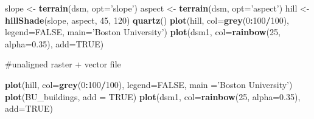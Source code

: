 \documentclass[]{article}
\newenvironment{Shaded}{\begin{snugshade}}{\end{snugshade}}
\newcommand{\DataTypeTok}[1]{\textcolor[rgb]{0.13,0.29,0.53}{#1}}
\newcommand{\DecValTok}[1]{\textcolor[rgb]{0.00,0.00,0.81}{#1}}
\newcommand{\FloatTok}[1]{\textcolor[rgb]{0.00,0.00,0.81}{#1}}
\newcommand{\KeywordTok}[1]{\textcolor[rgb]{0.13,0.29,0.53}{\textbf{#1}}}
\newcommand{\NormalTok}[1]{#1}
\newcommand{\OperatorTok}[1]{\textcolor[rgb]{0.81,0.36,0.00}{\textbf{#1}}}
\newcommand{\OtherTok}[1]{\textcolor[rgb]{0.56,0.35,0.01}{#1}}
\newcommand{\StringTok}[1]{\textcolor[rgb]{0.31,0.60,0.02}{#1}}
\begin{document}
\begin{Shaded}
\begin{Highlighting}[]
\NormalTok{slope  <-}\StringTok{ }\KeywordTok{terrain}\NormalTok{(dsm, }\DataTypeTok{opt=}\StringTok{'slope'}\NormalTok{)}
\NormalTok{aspect <-}\StringTok{ }\KeywordTok{terrain}\NormalTok{(dsm, }\DataTypeTok{opt=}\StringTok{'aspect'}\NormalTok{)}
\NormalTok{hill <-}\StringTok{ }\KeywordTok{hillShade}\NormalTok{(slope, aspect, }\DecValTok{45}\NormalTok{, }\DecValTok{120}\NormalTok{)}
\KeywordTok{quartz}\NormalTok{()}
\KeywordTok{plot}\NormalTok{(hill, }\DataTypeTok{col=}\KeywordTok{grey}\NormalTok{(}\DecValTok{0}\OperatorTok{:}\DecValTok{100}\OperatorTok{/}\DecValTok{100}\NormalTok{), }\DataTypeTok{legend=}\OtherTok{FALSE}\NormalTok{, }\DataTypeTok{main=}\StringTok{'Boston University'}\NormalTok{)}
\KeywordTok{plot}\NormalTok{(dsm1, }\DataTypeTok{col=}\KeywordTok{rainbow}\NormalTok{(}\DecValTok{25}\NormalTok{, }\DataTypeTok{alpha=}\FloatTok{0.35}\NormalTok{), }\DataTypeTok{add=}\OtherTok{TRUE}\NormalTok{)}
\end{Highlighting}
\end{Shaded}

\#unaligned raster + vector file

\begin{Shaded}
\begin{Highlighting}[]
\KeywordTok{plot}\NormalTok{(hill, }\DataTypeTok{col=}\KeywordTok{grey}\NormalTok{(}\DecValTok{0}\OperatorTok{:}\DecValTok{100}\OperatorTok{/}\DecValTok{100}\NormalTok{), }\DataTypeTok{legend=}\OtherTok{FALSE}\NormalTok{, }\DataTypeTok{main =}\StringTok{'Boston University'}\NormalTok{)}
\KeywordTok{plot}\NormalTok{(BU_buildings,}
     \DataTypeTok{add =} \OtherTok{TRUE}\NormalTok{)}
\KeywordTok{plot}\NormalTok{(dsm1, }\DataTypeTok{col=}\KeywordTok{rainbow}\NormalTok{(}\DecValTok{25}\NormalTok{, }\DataTypeTok{alpha=}\FloatTok{0.35}\NormalTok{), }\DataTypeTok{add=}\OtherTok{TRUE}\NormalTok{)}
\end{Highlighting}
\end{Shaded}
\end{document}
